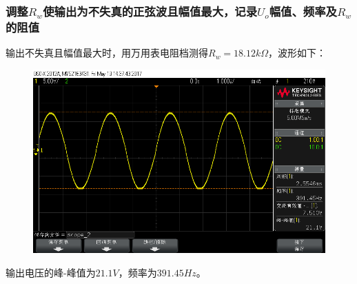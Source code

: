 \documentclass[12pt,a4paper]{article}
\begin{document}
\begin{spacing}{1.3}
\subsubsection{调整$R_w$使输出为不失真的正弦波且幅值最大，记录$U_o$幅值、频率及$R_w$的阻值}
输出不失真且幅值最大时，用万用表电阻档测得$R_w = 18.12k\Omega$，波形如下：
\begin{figure}[H]
\centering
\includegraphics[width=\textwidth]{scope_2.png}
\end{figure}
输出电压的峰-峰值为$21.1V$，频率为$391.45Hz$。

\end{spacing}
\end{document}

